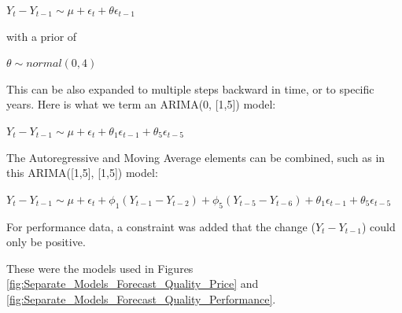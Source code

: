 \documentclass{article}
\begin{document}
$Y_t-Y_{t-1} \sim \mu + \epsilon_t + \theta \epsilon_{t-1}$

with a prior of

$\theta \sim normal(0,4)$

This can be also expanded to multiple steps backward in time, or to specific years. Here is what we term an ARIMA(0, [1,5]) model:

$Y_t-Y_{t-1} \sim \mu + \epsilon_t + \theta_1 \epsilon_{t-1} + \theta_5 \epsilon_{t-5}$

The Autoregressive and Moving Average elements can be combined, such as in this ARIMA([1,5], [1,5]) model:

$Y_t-Y_{t-1} \sim \mu + \epsilon_t + \phi_1 (Y_{t-1}-Y_{t-2}) + \phi_5 (Y_{t-5}-Y_{t-6}) + \theta_1 \epsilon_{t-1} + \theta_5 \epsilon_{t-5}$

For performance data, a constraint was added that the change ($Y_t-Y_{t-1}$) could only be positive. 

These were the models used in Figures \ref{fig:Separate_Models_Forecast_Quality_Price} and \ref{fig:Separate_Models_Forecast_Quality_Performance}.
\end{document}
